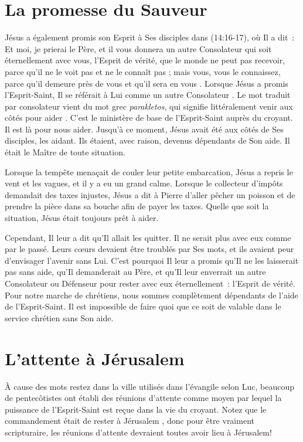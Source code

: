 \section*{La promesse du Sauveur}

Jésus a également promis son Esprit à Ses disciples dans (14:16-17), où Il a dit~: \og Et moi, je prierai le Père, et il vous donnera un autre Consolateur qui soit éternellement avec vous, l'Esprit de vérité, que le monde ne peut pas recevoir, parce qu'il ne le voit pas et ne le connaît pas ; mais vous, vous le connaissez, parce qu'il demeure près de vous et qu'il sera en vous \fg{}. Lorsque Jésus a promis l'Esprit-Saint, Il se référait à Lui comme \og un autre Consolateur \fg{}. Le mot traduit par consolateur vient du mot grec \emph{parakletos}, qui signifie littéralement \og venir aux côtés pour aider \fg{}. C'est le ministère de base de l'Esprit-Saint auprès du croyant. Il est là pour nous aider. Jusqu'à ce moment, Jésus avait été aux côtés de Ses disciples, les aidant. Ils étaient, avec raison, devenus dépendants de Son aide. Il était le Maître de toute situation.

Lorsque la tempête menaçait de couler leur petite embarcation, Jésus a repris le vent et les vagues, et il y a eu un grand calme. Lorsque le collecteur d'impôts demandait des taxes injustes, Jésus a dit à Pierre d'aller pêcher un poisson et de prendre la pièce dans sa bouche afin de payer les taxes. Quelle que soit la situation, Jésus était toujours prêt à aider.

Cependant, Il leur a dit qu'Il allait les quitter. Il ne serait plus avec eux comme par le passé. Leurs cœurs devaient être troublés par Ses mots, et ils avaient peur d'envisager l'avenir sans Lui. C'est pourquoi Il leur a promis qu'Il ne les laisserait pas sans aide, qu'Il demanderait au Père, et qu'Il leur enverrait un autre Consolateur ou Défenseur pour rester avec eux éternellement~: l'Esprit de vérité. Pour notre marche de chrétiens, nous sommes complètement dépendants de l'aide de l'Esprit-Saint. Il est impossible de faire quoi que ce soit de valable dans le service chrétien sans Son aide.

\section*{L'attente à Jérusalem}

À cause des mots \og restez dans la ville \fg{} utilisés dans
 l'évangile selon Luc, beaucoup de pentecôtistes ont établi des \og réunions
 d'attente \fg{} comme moyen par lequel la puissance de l'Esprit-Saint est
 reçue dans la vie du croyant. Notez que le commandement était de \og rester
 à Jérusalem \fg{} ,
 donc pour être vraiment scripturaire, les réunions d'attente devraient toutes
 avoir lieu à Jérusalem!

